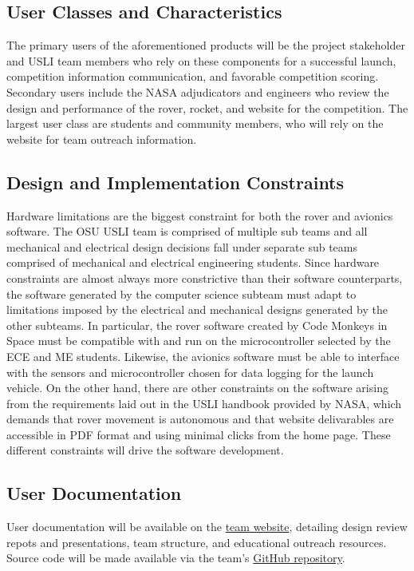 \documentclass[onecolumn, draftclsnofoot, 10pt, compsoc]{IEEEtran}
\begin{document}
\subsection{User Classes and Characteristics}
The primary users of the aforementioned products will be the project stakeholder and USLI team members who rely on these components for a successful launch, competition information communication, and favorable competition scoring. Secondary users include the NASA adjudicators and engineers who review the design and performance of the rover, rocket, and website for the competition. The largest user class are students and community members, who will rely on the website for team outreach information.

\subsection{Design and Implementation Constraints}
Hardware limitations are the biggest constraint for both the rover and avionics software. The OSU USLI team is comprised of multiple sub teams and all mechanical and electrical design decisions fall under separate sub teams comprised of mechanical and electrical engineering students. Since hardware constraints are almost always more constrictive than their software counterparts, the software generated by the computer science subteam must adapt to limitations imposed by the electrical and mechanical designs generated by the other subteams. In particular, the rover software created by Code Monkeys in Space must be compatible with and run on the microcontroller selected by the ECE and ME students. Likewise, the avionics software must be able to interface with the sensors and microcontroller chosen for data logging for the launch vehicle. On the other hand, there are other constraints on the software arising from the requirements laid out in the USLI handbook provided by NASA, which demands that rover movement is autonomous and that website delivarables are accessible in PDF format and using minimal clicks from the home page. These different constraints will drive the software development.

\subsection{User Documentation}
User documentation will be available on the \href{http://osuusli.com/}{team website}, detailing design review repots and presentations, team structure, and educational outreach resources. Source code will be made available via the team's \href{https://github.com/OSU-USLI-18/Payload-Software}{GitHub repository}.
\end{document}
